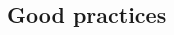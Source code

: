 \documentclass[xcolor=x11names,compress, aspectratio=169]{beamer}
\renewcommand{\(}{\begin{columns}}
\renewcommand{\)}{\end{columns}}
\newcommand{\<}[1]{\begin{column}{#1}}
\renewcommand{\>}{\end{column}}
\begin{document}
\begin{frame}
\begin{columns}[t]
\begin{column}{0.5\textwidth}
\begin{center}
   \end{center}
  \end{column}
\end{columns}
\end{frame}

\subsection{Good practices}
\end{document}

